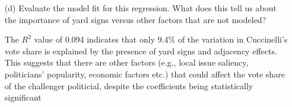 \documentclass[12pt,letterpaper]{article}
\begin{document}
\begin{enumerate}
	\item [(d)] Evaluate the model fit for this regression.  What does this	tell us about the importance of yard signs versus other factors that are not modeled?
	
	The \( R^2 \) value of 0.094 indicates that only 9.4\% of the variation in Cuccinelli's vote share is explained by the presence of yard signs and adjacency effects. This suggests that there are other factors (e.g., local issue saliency, politicians' popularity, economic factors etc.) that could affect the vote share of the challenger politicial, despite the coefficients being statistically significant 

	
\end{enumerate}  
\end{document}
